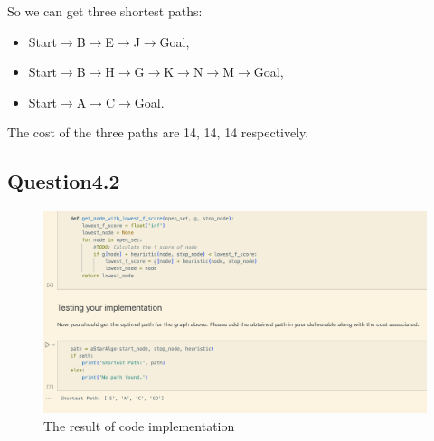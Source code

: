 \documentclass{article}
\begin{document}
            So we can get three shortest paths: 
            \begin{itemize}
                \item Start$\rightarrow$B$\rightarrow$E$\rightarrow$J$\rightarrow$Goal, 
                \item Start$\rightarrow$B$\rightarrow$H$\rightarrow$G$\rightarrow$K$\rightarrow$N$\rightarrow$M$\rightarrow$Goal, 
                \item Start$\rightarrow$A$\rightarrow$C$\rightarrow$Goal. 
            \end{itemize} 
            The cost of the three paths are 14, 14, 14 respectively.
        \subsection{Question4.2}
        \begin{figure}[H]
            \centering
            \includegraphics[width=1\linewidth]{img5.jpeg}
            \caption{The result of code implementation}
            \label{5}
        \end{figure}

    \newpage
\end{document}
